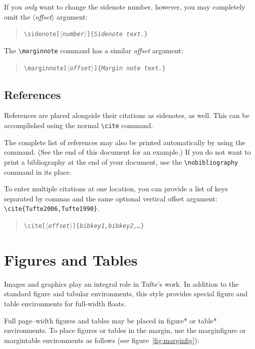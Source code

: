 \documentclass{tufte-handout}
\newcommand{\doccmd}[1]{\texttt{\textbackslash#1}}%
\newcommand{\docopt}[1]{\ensuremath{\langle}\textrm{\textit{#1}}\ensuremath{\rangle}}%
\newcommand{\docarg}[1]{\textrm{\textit{#1}}}%
\newenvironment{docspec}{\begin{quote}\noindent}{\end{quote}}%
\newcommand{\docenv}[1]{\textsf{#1}}%
\begin{document}
If you \emph{only} want to change the sidenote number, however, you may
completely omit the \docopt{offset} argument:
\begin{docspec}
  \doccmd{sidenote[\docopt{number}]\{\docarg{Sidenote text.}\}}
\end{docspec}

The \Verb|\marginnote| command has a similar \docarg{offset} argument:
\begin{docspec}
  \doccmd{marginnote[\docopt{offset}]\{\docarg{Margin note text.}\}}
\end{docspec}

\subsection{References}
References are placed alongside their citations as sidenotes,
as well.  This can be accomplished using the normal \Verb|\cite|
command.

The complete list of references may also be printed automatically by using
the \Verb|| command.  (See the end of this document for an
example.)  If you do not want to print a bibliography at the end of your
document, use the \Verb|\nobibliography| command in its place.  

To enter multiple citations at one location,\cite{Tufte2006,Tufte1990} you can
provide a list of keys separated by commas and the same optional vertical
offset argument: \Verb|\cite{Tufte2006,Tufte1990}|.  
\begin{docspec}
  \doccmd{cite[\docopt{offset}]\{\docarg{bibkey1,bibkey2,\ldots}\}}
\end{docspec}

\section{Figures and Tables}\label{sec:figures-and-tables}
Images and graphics play an integral role in Tufte's work.
In addition to the standard \docenv{figure} and \docenv{tabular} environments,
this style provides special figure and table environments for full-width
floats.

Full page--width figures and tables may be placed in \docenv{figure*} or
\docenv{table*} environments.  To place figures or tables in the margin,
use the \docenv{marginfigure} or \docenv{margintable} environments as follows
(see figure~\ref{fig:marginfig}):
\end{document}
